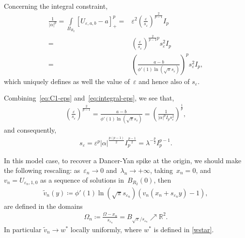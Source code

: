 \documentclass[10pt]{amsart}
\newcommand{\parenthesis}[1]{\left(#1\right)} %
\newcommand{\R}{\mathbb{R}}
\def\R{\mathbb{R}}
\renewcommand{\to}{\rightarrow}
\begin{document}
\

Concerning the integral constraint,
\begin{align}\label{eq:integral-eps}
    \frac{1}{|\alpha|^p} = \int\limits_{B_{R_2}} [U_{\varepsilon,a,b} -a ]_+^p
    =&\varepsilon^2\parenthesis{\frac{\varepsilon}{s_\varepsilon}}^{\frac{2}{p-1}} I_p \\ \nonumber
    =&\parenthesis{\frac{\varepsilon}{s_\varepsilon}}^{\frac{2}{p-1}p} s_\varepsilon^2  I_p \\  \nonumber
    =&\parenthesis{\frac{a-b}{\phi{'}(1)\ln(\sqrt{\pi}s_\varepsilon)}}^p s_\varepsilon^2 I_p,
\end{align}
which uniquely defines as well the value of~$\varepsilon$ and hence also of $s_\varepsilon$.


Combining~\eqref{eq:C1-eps} and~\eqref{eq:integral-eps}, we see that,
\begin{align*}
    \parenthesis{\frac{\varepsilon}{s_{\varepsilon}}}^{\frac{2}{p-1}}=\frac{a-b}{\phi{'}(1)\ln(\sqrt{\pi}s_\varepsilon)}
    =\parenthesis{\frac{1}{|\alpha|^p I_p s_\varepsilon^2}}^{\frac{1}{p}},
\end{align*}
and consequently,
\begin{align*}
    s_\varepsilon= \varepsilon^p |\alpha|^{\frac{p(p-1)}{2}} I_p^{\frac{p-1}{2}}
    =\lambda^{-\frac{p}{2}} I_p^{p-1}.
\end{align*}


In this model case, to recover a Dancer-Yan spike at the origin, we should make the following rescaling:
as~$\varepsilon_n\to 0$ and~$\lambda_n\to +\infty$, taking~$x_n=0$, and~$v_n= U_{\varepsilon_n, 1,0}$ as a sequence of solutions in~$B_{R_2}(0)$, then
\begin{align}\label{eq:rescale-2d model}
    \widetilde{v}_n(y)\coloneqq {\phi{'}(1)\ln(\sqrt{\pi}s_{\varepsilon_n})}\parenthesis{v_n(x_n+ s_{\varepsilon_n}y) -1 },
\end{align}
are defined in the domains
\begin{align*}
    \Omega_n \coloneqq \frac{\Omega -x_n}{s_{\varepsilon_n}}= B_{\sqrt{\pi}/s_{\varepsilon_n}} \nearrow \R^2.
\end{align*}
In particular $\widetilde{v}_n\to  w^*$ locally uniformly, where $w^*$ is defined in \eqref{wstar}.

\bigskip
\end{document}
